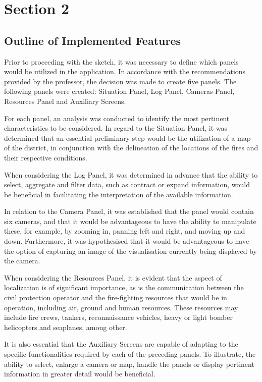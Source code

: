 \chapter{Section 2} \label{section2}
\section{Outline of Implemented Features}
Prior to proceeding with the sketch, it was necessary to define which panels would be utilized in the application. In accordance with the recommendations provided by the professor, the decision was made to create five panels. The following panels were created: Situation Panel, Log Panel, Cameras Panel, Resources Panel and Auxiliary Screens. \par
For each panel, an analysis was conducted to identify the most pertinent characteristics to be considered. In regard to the Situation Panel, it was determined that an essential preliminary step would be the utilization of a map of the district, in conjunction with the delineation of the locations of the fires and their respective conditions. \par
When considering the Log Panel, it was determined in advance that the ability to select, aggregate and filter data, such as contract or expand information, would be beneficial in facilitating the interpretation of the available information. \par
In relation to the Camera Panel, it was established that the panel would contain six cameras, and that it would be advantageous to have the ability to manipulate these, for example, by zooming in, panning left and right, and moving up and down. Furthermore, it was hypothesised that it would be advantageous to have the option of capturing an image of the visualisation currently being displayed by the camera. \par
When considering the Resources Panel, it is evident that the aspect of localization is of significant importance, as is the communication between the civil protection operator and the fire-fighting resources that would be in operation, including air, ground and human resources. These resources may include fire crews, tankers, reconnaissance vehicles, heavy or light bomber helicopters and seaplanes, among other. \par
It is also essential that the Auxiliary Screens are capable of adapting to the specific functionalities required by each of the preceding panels. To illustrate, the ability to select, enlarge a camera or map, handle the panels or display pertinent information in greater detail would be beneficial. \par

